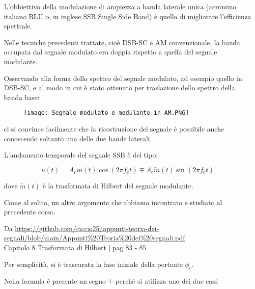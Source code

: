 L'obbiettivo della modulazione di ampiezza a banda laterale unica (acronimo italiano BLU o, in inglese SSB Single Side Band) 
è quello di migliorare l'efficienza spettrale. \newline 

Nelle tecniche precedenti trattate, cioè DSB-SC e AM convenzionale, 
la banda occupata dal segnale modulato era doppia rispetto a quella del segnale modulante. \newline 

Osservando alla forma dello spettro del segnale modulato, ad esempio quello in DSB-SC, e al modo in cui è stato ottenuto per traslazione dello spettro della banda base: 

\begin{figure}[h]
    \centering
    \texttt{[image: Segnale modulato e modulante in AM.PNG]}
\end{figure} 

ci si convince facilmente che la ricostruzione del segnale è possibile anche conoscendo soltanto una delle due bande laterali. \newline 

L'andamento temporale del segnale SSB è del tipo: 

{
    \Large 
    \begin{equation}
        u(t)
        =
        A_c m(t) \cos(2 \pi f_c t)
        \mp
        A_c \tilde{m}(t) \sin(2 \pi f_c t)
    \end{equation}
}

dove $\tilde{m}(t)$ è la trasformata di Hilbert del segnale modulante. \newline 

\begin{tcolorbox}
    Come al solito, un altro argomento che abbiamo incontrato e studiato al precedente corso. \newline 

    Da \url{https://github.com/ciccio25/appunti-teoria-dei-segnali/blob/main/Appunti%20Teoria%20dei%20segnali.pdf} \\
    Capitolo 8 Trasformata di Hilbert | pag 83 - 85 \newline

\end{tcolorbox}

Per semplicità, si è trascurata la fase iniziale della portante $\phi_c$. \newline 

Nella formula è presente un segno $\mp$ perché si utilizza uno dei due casi: 


